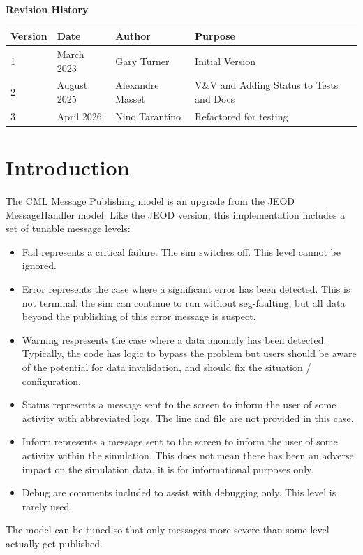 \documentclass[11pt,fleqn]{report}
\begin{document}
\titlePage
\clearpage %
\tableofcontents %
\vfill
{\Large \textbf {Revision History}}
{\large
\begin{center}
\begin{tabular}{|l||l|l|l|}
\hline
 \textbf{Version} & \textbf{Date} & \textbf{Author} & \textbf{Purpose} \\ \hline
 \hline
1 & March 2023 & Gary Turner & Initial Version \\ \hline
 \hline
2 & August 2025 & Alexandre Masset & V\&V and Adding Status to Tests and Docs \\ \hline
 \hline
3 & April 2026 & Nino Tarantino & Refactored for testing \\ \hline
\end{tabular}
\end{center}
}

\chapter{Introduction} %
The CML Message Publishing model is an upgrade from the JEOD MessageHandler
model. Like the JEOD version, this implementation includes a set of tunable
message levels:
\begin{itemize}
\item Fail represents a critical failure. The sim switches off. This level
cannot be ignored.
\item Error represents the case where a significant error has been detected.
This is not terminal, the sim can continue to run without seg-faulting, but all
data beyond the publishing of this error message is suspect.
\item Warning respresents the case where a data anomaly has been detected.
Typically, the code has logic to bypass the problem but users should be aware
of the potential for data invalidation, and should fix the situation /
configuration.
\item Status represents a message sent to the screen to inform the user of some activity 
with abbreviated logs. The line and file are not provided in this case.
\item Inform represents a message sent to the screen to inform the user of some
activity within the simulation. This does not mean there has been an adverse
impact on the simulation data, it is for informational purposes only.
\item Debug are comments included to assist with debugging only. This level is
rarely used.
\end{itemize}
The model can be tuned so that only messages more severe than some level
actually get published.
\end{document}
